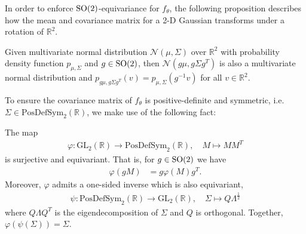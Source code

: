 In order to enforce $\mathrm{SO}(2)$-equivariance for $f_\theta$, the following proposition describes how the mean and covariance matrix for a 2-D  Gaussian  transforms under a rotation of $\mathbb{R}^2$. 

\begin{proposition}  \label{prop:equivnormal}
Given multivariate normal distribution $\mathcal{N}(\mu,\Sigma)$ over $\mathbb{R}^2$ with probability density function $p_{\mu, \Sigma}$ and $g\in \mathrm{SO}(2)$, then $\mathcal{N}(g\mu, g\Sigma g^T)$ is also a multivariate normal distribution and $p_{g\mu, g\Sigma g^T} (v) = p_{\mu, \Sigma} (g^{-1}v)$ for all $v \in \mathbb{R}^2$.
\end{proposition}  

To ensure the covariance matrix of $f_\theta$ is positive-definite and symmetric, i.e. $\Sigma \in \mathrm{PosDefSym}_2(\mathbb{R})$, we make use of the following fact: 

\begin{proposition} \label{prop:pds}
The map
\begin{align}
    \varphi \colon \mathrm{GL}_2(\mathbb{R}) \to \mathrm{PosDefSym}_2(\mathbb{R}) , \quad 
    M \mapsto M M^T \label{eq:phi}
\end{align}
is surjective and equivariant. That is, for $g \in \mathrm{SO}(2)$ we have
\begin{align}
    \varphi(gM) &= g \varphi(M) g^{T} \label{eq:act_on_gl2}. 
\end{align}
Moreover, $\varphi$ admits a one-sided inverse which is also equivariant,
\begin{align}
        \psi \colon \mathrm{PosDefSym}_2(\mathbb{R}) \to \mathrm{GL}_2(\mathbb{R}), \quad    
        \Sigma \mapsto Q \Lambda^{\frac{1}{2}}
\end{align}
where $Q\Lambda Q^T$ is the eigendecomposition of $\Sigma$ and $Q$ is orthogonal. Together, $\varphi (\psi(\Sigma)) = \Sigma$.
\end{proposition}

